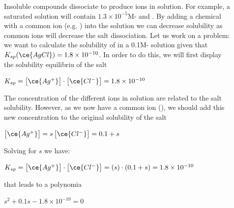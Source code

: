 \documentclass[main.tex]{subfiles}
\begin{document}
\begin{description}
\item[]
Insoluble compounds dissociate to produce ions in solution. For example, a saturated  solution will contain $1.3\times 10^{-5}$M- and . By adding a chemical with a common ion (e.g. ) into the solution we can decrease solubility as common ions will decrease the salt dissociation. Let us work on a problem: we want to calculate the solubility of  in a 0.1M- solution given that $K_{sp}(\ce{AgCl})=1.8\times 10^{-10}$. In order to do this, we will first display the solubility equilibriu of the salt
\begin{center}\hfill $K_{sp}= \big[ \ce{Ag^+} \big]\cdot \big[ \ce{Cl^-} \big]=1.8\times 10^{-10}$\end{center}
The concentration of the different ions in solution are related to the salt solubility. However, as we now have a common ion (), we should add this new concentration to the original solubility of the salt
\begin{center}$\big[ \ce{Ag^{+}}\big]=s$\hfill$\big[ \ce{Cl^{-}}\big]=0.1+s$\end{center}
Solving for $s$ we have:
\begin{center}$K_{sp}= \big[ \ce{Ag^+} \big]\cdot \big[ \ce{Cl^-} \big]=(s)\cdot(0.1+s)=1.8\times 10^{-10}$\end{center}
that leads to a polynomia
\begin{center}$s^2 + 0.1s -1.8\times 10^{-10}=0$\end{center}

\end{description}
\end{document}
